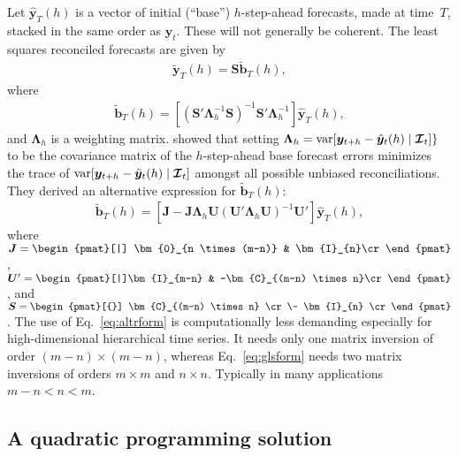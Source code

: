\documentclass[11pt]{article}
\newcommand{\var}{\textnormal{var}}
\newcommand{\bS}{\bm{S}}
\newcommand{\bC}{\bm{C}}
\newcommand{\bI}{\bm{I}}
\newcommand{\0}{\phantom{0}}
\begin{document}
Let $\hat{\bm{y}}_T(h)$ is a vector of initial (``base'') $h$-step-ahead forecasts, made at time~$T$, stacked in the same order as $\bm{y}_t$. These will not generally be coherent. The least squares reconciled forecasts are given by
\begin{align*}
\tilde{\bm{y}}_{T}(h) = \bm{S}\tilde{\bm{b}}_{T}(h),
\end{align*}
where 
\begin{align}
\tilde{\bm{b}}_{T}(h) = \left[(\bm{S}'\bm{\Lambda}_{h}^{-1}\bm{S})^{-1}\bm{S}'\bm{\Lambda}_{h}^{-1}\right]\hat{\bm{y}}_{T}(h),
\label{eq:glsform}
\end{align}
and $\bm{\Lambda}_h$ is a weighting matrix. \citet{Wick2018} showed that setting $\bm{\Lambda}_h =\var[\bm{y}_{t+h} - \hat{\bm{y}}_{t}(h)\mid\bm{\mathcal{I}}_{t}]\}$ to be the covariance matrix of the $h$-step-ahead base forecast errors minimizes the trace of 
$\var[\bm{y}_{t+h} - \tilde{\bm{y}}_{t}(h)\mid \bm{\mathcal{I}}_{t}]$ amongst all possible unbiased reconciliations. They derived an alternative expression for $\tilde{\bm{b}}_{T}(h)$:
\begin{align}
\tilde{\bm{b}}_{T}(h) = \left[\bm{J} - \bm{J}\bm{\Lambda}_h\bm{U}(\bm{U}'\bm{\Lambda}_h\bm{U})^{-1}\bm{U}'\right]\hat{\bm{y}}_{T}(h),
\label{eq:altrform}
\end{align}
where $\bm{J} = \begin{pmat}[|] \bm{0}_{n \times (m-n)} & \bI_{n}\cr\end{pmat}$,\quad
$\bm{U}' = \begin{pmat}[|]\bI_{m-n}  & -\bC_{(m-n) \times n}\cr\end{pmat}$,
and $\bS = \begin{pmat}[{}]
\bC_{(m-n) \times n} \cr\-
\bI_{n} \cr
\end{pmat}$. The use of Eq.\ \eqref{eq:altrform} is computationally less demanding especially for high-dimensional hierarchical time series. It needs only one matrix inversion of order $(m - n) \times (m - n)$, whereas Eq.\ \eqref{eq:glsform} needs two matrix inversions of orders $m \times m$ and $n \times n$. Typically in many applications $m-n < n < m$.

\subsection{A quadratic programming solution}
\end{document}
